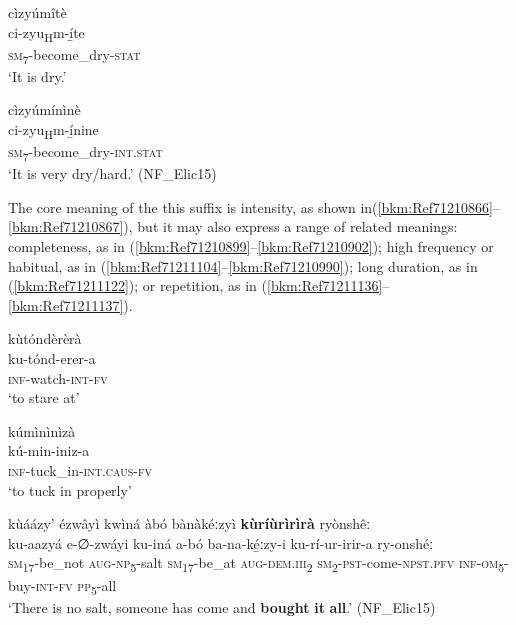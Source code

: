 \ea
\label{bkm:Ref506372689}
\glll cìzyúmîtè\\
ci-zyu\textsubscript{H}m-í̲te\\
\textsc{sm}\textsubscript{7}-become\_dry-\textsc{stat}\\
\glt ‘It is dry.’
\z

\ea
\label{bkm:Ref74916113}
\glll cìzyúmínìnè\\
ci-zyu\textsubscript{H}m-í̲nine\\
\textsc{sm}\textsubscript{7}-become\_dry-\textsc{int}.\textsc{stat}\\
\glt ‘It is very dry/hard.’ (NF\_Elic15)
\z

The core meaning of the this suffix is intensity, as shown in(\ref{bkm:Ref71210866}--\ref{bkm:Ref71210867}), but it may also express a range of related meanings: completeness, as in (\ref{bkm:Ref71210899}--\ref{bkm:Ref71210902}); high frequency or habitual, as in (\ref{bkm:Ref71211104}--\ref{bkm:Ref71210990}); long duration, as in (\ref{bkm:Ref71211122}); or repetition, as in (\ref{bkm:Ref71211136}--\ref{bkm:Ref71211137}).

\ea
\label{bkm:Ref71210866}
\glll kùtóndèrèrà\\
ku-tónd-erer-a\\
\textsc{inf}-watch-\textsc{int}-\textsc{fv}\\
\glt ‘to stare at’
\z

\ea
\label{bkm:Ref71210867}
\glll kúmìnìnìzà\\
kú-min-iniz-a\\
\textsc{inf}-tuck\_in-\textsc{int}.\textsc{caus}-\textsc{fv}\\
\glt ‘to tuck in properly’
\z

\ea
\label{bkm:Ref71210899}
kùáázy’ ézwâyì kwìná àbó bànàkéːzyì \textbf{kùríùrìrìrà} ryònshêː\\
\gll ku-aazyá  e-∅-zwáyi  ku-iná    a-bó ba-na-ké̲ːzy-i    ku-rí-ur-irir-a    ry-onshéː\\
\textsc{sm}\textsubscript{17}-be\_not  \textsc{aug}-\textsc{np}\textsubscript{5}-salt  \textsc{sm}\textsubscript{17}-be\_at  \textsc{aug}-\textsc{dem}.\textsc{iii}\textsubscript{2}
\textsc{sm}\textsubscript{2}-\textsc{pst}-come-\textsc{npst}.\textsc{pfv}  \textsc{inf}-\textsc{om}\textsubscript{5}-buy-\textsc{int}-\textsc{fv}  \textsc{pp}\textsubscript{5}-all\\
\glt ‘There is no salt, someone has come and \textbf{bought} \textbf{it} \textbf{all}.’ (NF\_Elic15)
\z

